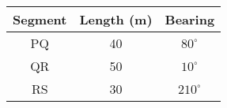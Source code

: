 \begin{tabular}{|c|c|c|}
\hline
Segment & Length (m) & Bearing \\
\hline
PQ & 40 & $80^\circ$ \\
QR & 50 & $10^\circ$ \\
RS & 30 & $210^\circ$ \\
\hline
\end{tabular}